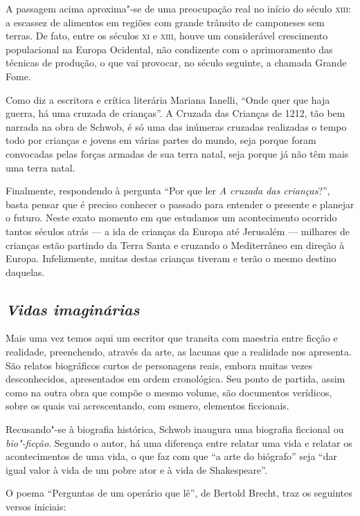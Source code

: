 \documentclass[12pt]{extarticle}
\begin{document}
A passagem acima aproxima"-se de uma preocupação real no início do século
\textsc{xiii}: a escassez de alimentos em regiões com grande trânsito de
camponeses sem terras. De fato, entre os séculos \textsc{xi} e \textsc{xiii}, houve um
considerável crescimento populacional na Europa Ocidental, não
condizente com o aprimoramento das técnicas de produção, o que vai
provocar, no século seguinte, a chamada Grande Fome.

Como diz a escritora e crítica literária Mariana Ianelli, ``Onde quer
que haja guerra, há uma cruzada de crianças''. A Cruzada das Crianças
de 1212, tão bem narrada na obra de Schwob, é só uma das inúmeras
cruzadas realizadas o tempo todo por crianças e jovens em várias partes
do mundo, seja porque foram convocadas pelas forças armadas de sua terra
natal, seja porque já não têm mais uma terra natal.

Finalmente, respondendo à pergunta ``Por que ler \textit{A cruzada das crianças}?'',
basta pensar que é preciso conhecer o passado para entender o presente e
planejar o futuro. Neste exato momento em que estudamos um acontecimento
ocorrido tantos séculos atrás --- a ida de crianças da Europa até
Jerusalém --- milhares de crianças estão partindo da Terra Santa e
cruzando o Mediterrâneo em direção à Europa. Infelizmente, muitas destas
crianças tiveram e terão o mesmo destino daquelas.

\subsection{\emph{Vidas imaginárias}}

Mais uma vez temos aqui um escritor que transita com maestria entre
ficção e realidade, preenchendo, através da arte, as lacunas que a
realidade nos apresenta. São relatos biográficos curtos de personagens
reais, embora muitas vezes desconhecidos, apresentados em ordem
cronológica. Seu ponto de partida, assim como na outra obra que compõe o
mesmo volume, são documentos verídicos, sobre os quais vai
acrescentando, com esmero, elementos ficcionais.

Recusando"-se à biografia histórica, Schwob inaugura uma biografia
ficcional ou \emph{bio"-ficção}. Segundo o autor, há uma diferença entre relatar
uma vida e relatar os acontecimentos de uma vida, o que faz com que ``a
arte do biógrafo'' seja ``dar igual valor à vida de um pobre ator e à
vida de Shakespeare''.

O poema ``Perguntas de um operário que lê'', de Bertold Brecht, traz os
seguintes versos iniciais:
\end{document}
